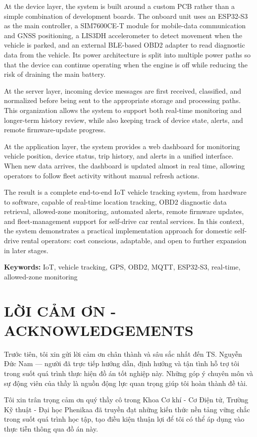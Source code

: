 \documentclass[a4paper]{extarticle}
\newcommand{\majorheading}[1]{%
  \clearpage
  \phantomsection
  \section*{#1}%
  \addcontentsline{toc}{section}{#1}%
}
\begin{document}
At the device layer, the system is built around a custom PCB rather than
a simple combination of development boards. The onboard unit uses an
ESP32-S3 as the main controller, a SIM7600CE-T module for mobile-data
communication and GNSS positioning, a LIS3DH accelerometer to detect
movement when the vehicle is parked, and an external BLE-based OBD2
adapter to read diagnostic data from the vehicle. Its power architecture
is split into multiple power paths so that the device can continue operating
when the engine is off while reducing the risk of draining the main
battery.

At the server layer, incoming device messages are first received,
classified, and normalized before being sent to the appropriate storage
and processing paths. This organization allows the system to support
both real-time monitoring and longer-term history review, while also
keeping track of device state, alerts, and remote firmware-update
progress.

At the application layer, the system provides a web dashboard for
monitoring vehicle position, device status, trip history, and alerts in
a unified interface. When new data arrives, the dashboard is updated
almost in real time, allowing operators to follow fleet activity without
manual refresh actions.

The result is a complete end-to-end IoT vehicle tracking system, from
hardware to software, capable of real-time location tracking, OBD2
diagnostic data retrieval, allowed-zone monitoring, automated alerts,
remote firmware updates, and fleet-management support for self-drive car
rental services. In this context, the system demonstrates a practical
implementation approach for domestic self-drive rental operators: cost
conscious, adaptable, and open to further expansion in later stages.

\textbf{Keywords:} IoT, vehicle tracking, GPS, OBD2, MQTT, ESP32-S3,
real-time, allowed-zone monitoring

\majorheading{LỜI CẢM ƠN - ACKNOWLEDGEMENTS}\label{lux1eddi-cux1ea3m-ux1a1n---acknowledgements}

Trước tiên, tôi xin gửi lời cảm ơn chân thành và sâu sắc nhất đến TS.
Nguyễn Đức Nam --- người đã trực tiếp hướng dẫn, định hướng và tận tình hỗ
trợ tôi trong suốt quá trình thực hiện đồ án tốt nghiệp này. Những góp ý
chuyên môn và sự động viên của thầy là nguồn động lực quan trọng giúp
tôi hoàn thành đề tài.

Tôi xin trân trọng cảm ơn quý thầy cô trong Khoa Cơ khí - Cơ Điện tử,
Trường Kỹ thuật - Đại học Phenikaa đã truyền đạt những kiến thức nền
tảng vững chắc trong suốt quá trình học tập, tạo điều kiện thuận lợi để
tôi có thể áp dụng vào thực tiễn thông qua đồ án này.
\end{document}
